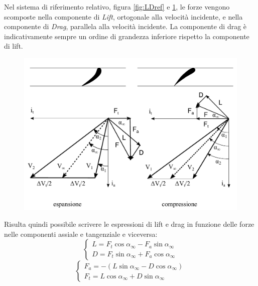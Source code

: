Nel sistema di riferimento relativo, figura \ref{fig:LDref} e \ref{fig:triang1}, le forze vengono scomposte nella componente di \textit{Lift}, ortogonale alla velocità incidente, e nella componente di \textit{Drag}, parallela alla velocità incidente. La componente di drag è indicativamente sempre un ordine di grandezza inferiore rispetto la componente di lift.
\begin{figure}
\centering
  \includegraphics[width=.7\textwidth]{fig/triang1.pdf}
\caption{}
\label{fig:triang1}
\end{figure}
Risulta quindi possibile scrivere le espressioni di lift e drag in funzione delle forze nelle componenti assiale e tangenziale e viceversa:
\begin{equation}
	\begin{cases} 
		L = F_t \cos \alpha_{\infty} -  F_a \sin \alpha_{\infty}\\
		D = F_t \sin \alpha_{\infty} +  F_a \cos \alpha_{\infty}
	\end{cases}
\end{equation}
\begin{equation}
	\begin{cases} 
		F_a = - (L\sin \alpha_{\infty} -  D \cos \alpha_{\infty})\\
		F_t = L \cos \alpha_{\infty} +  D \sin \alpha_{\infty}
	\end{cases}
\end{equation}

